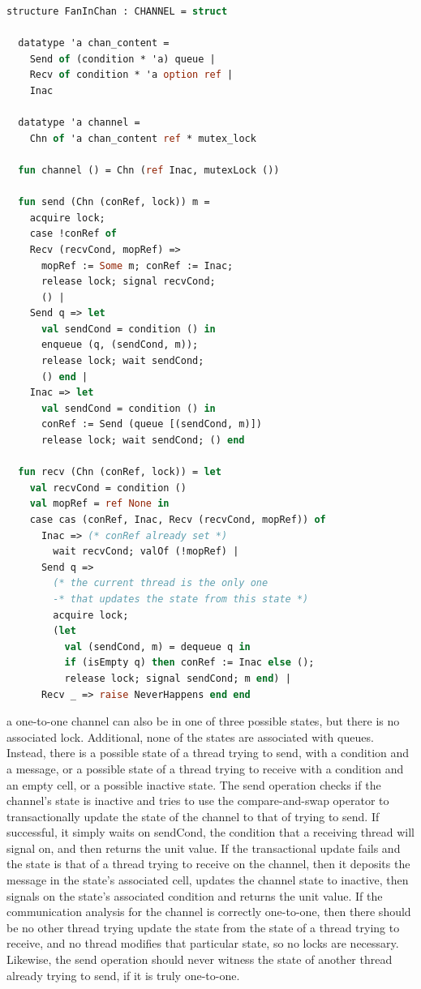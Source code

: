 \documentclass{article}
\begin{document}
\begin{lstlisting}[language=ML, escapechar=\%]
  structure FanInChan : CHANNEL = struct

  datatype 'a chan_content =
    Send of (condition * 'a) queue |
    Recv of condition * 'a option ref |
    Inac

  datatype 'a channel =
    Chn of 'a chan_content ref * mutex_lock

  fun channel () = Chn (ref Inac, mutexLock ())

  fun send (Chn (conRef, lock)) m = 
    acquire lock;
    case !conRef of
    Recv (recvCond, mopRef) => 
      mopRef := Some m; conRef := Inac;
      release lock; signal recvCond;
      () |
    Send q => let
      val sendCond = condition () in
      enqueue (q, (sendCond, m));
      release lock; wait sendCond;
      () end |
    Inac => let
      val sendCond = condition () in
      conRef := Send (queue [(sendCond, m)])
      release lock; wait sendCond; () end 

  fun recv (Chn (conRef, lock)) = let
    val recvCond = condition () 
    val mopRef = ref None in
    case cas (conRef, Inac, Recv (recvCond, mopRef)) of
      Inac => (* conRef already set *)
        wait recvCond; valOf (!mopRef) |
      Send q =>
        (* the current thread is the only one
        -* that updates the state from this state *)
        acquire lock;
        (let
          val (sendCond, m) = dequeue q in
          if (isEmpty q) then conRef := Inac else (); 
          release lock; signal sendCond; m end) |
      Recv _ => raise NeverHappens end end

  \end{lstlisting}

a one-to-one channel can also be in one of three possible states, but there is no associated
lock. Additional, none of the states are associated with queues.  Instead, there is a possible
state of a thread trying to send, with a condition and a message, or a possible state of a
thread trying to receive with a condition and an empty cell, or a possible inactive state.
The send operation checks if the channel's state is inactive and tries to use the
compare-and-swap operator to transactionally update the state of the channel to that of trying to
send.  If successful, it simply waits on sendCond, the condition that a receiving thread will
signal on, and then returns the unit value.  If the transactional update fails and the state is
that of a thread trying to receive on the channel, then it deposits the message in the state's
associated cell, updates the channel state to inactive, then signals on the state's associated
condition and returns the unit value.  If the communication analysis for the channel is
correctly one-to-one, then there should be no other thread trying update the state from the
state of a thread trying to receive, and no thread modifies that particular state, so no locks
are necessary.  Likewise, the send operation should never witness the state of another thread
already trying to send, if it is truly one-to-one.
\end{document}
